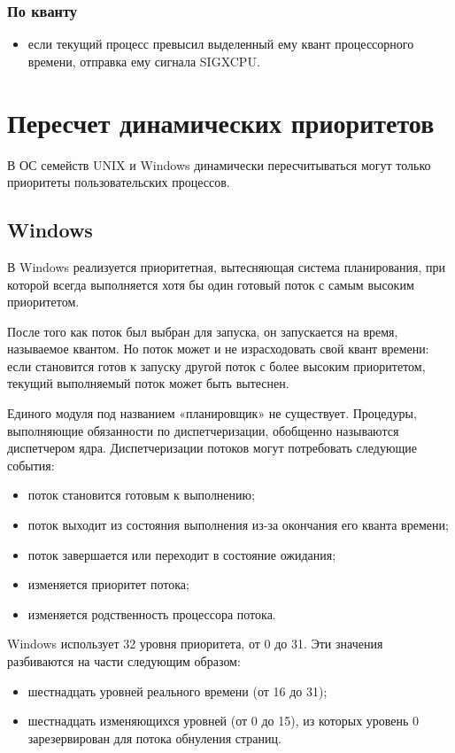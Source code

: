 \documentclass[a4paper,oneside,14pt]{extarticle}
\begin{document}
\subsubsection*{По кванту}
\begin{itemize}
	\item если текущий процесс превысил выделенный ему квант процессорного времени, отправка ему сигнала SIGXCPU.
\end{itemize}

\section{Пересчет динамических приоритетов}

В ОС семейств UNIX и Windows динамически пересчитываться могут только приоритеты пользовательских процессов.

\subsection{Windows}
В Windows реализуется приоритетная, вытесняющая система планирования, при  которой всегда выполняется хотя бы один готовый поток с самым высоким приоритетом. 

После того как поток был выбран для запуска, он запускается на время, называемое квантом.
Но поток может и не израсходовать свой квант времени: если становится готов к запуску другой поток с более высоким приоритетом, текущий выполняемый поток может быть вытеснен.

Единого модуля под названием «планировщик» не существует.
Процедуры, выполняющие обязанности по диспетчеризации, обобщенно называются диспетчером ядра.
Диспетчеризации потоков могут потребовать следующие события:
\begin{itemize}
	\item поток становится готовым к выполнению;
	\item поток выходит из состояния выполнения из-за окончания его кванта времени;
	\item поток завершается или переходит в состояние ожидания;
	\item изменяется приоритет потока;
	\item изменяется родственность процессора потока.
\end{itemize}

Windows использует 32 уровня приоритета, от 0 до 31. Эти значения  разбиваются на части следующим образом:
\begin{itemize}
	\item шестнадцать уровней реального времени (от 16 до 31);
	\item шестнадцать изменяющихся уровней (от 0 до 15), из которых уровень 0 зарезервирован для потока обнуления страниц. 
\end{itemize}
\end{document}
